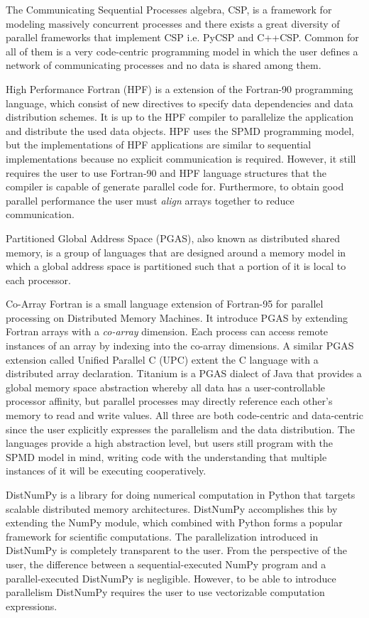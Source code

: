 \documentclass{acm_proc_article-sp}
\begin{document}
The Communicating Sequential Processes algebra, CSP\cite{CSPHoare78}, is a framework for modeling massively concurrent processes and there exists a great diversity of parallel frameworks that implement CSP i.e. PyCSP\cite{PyCSP07} and C++CSP\cite{CSP_Brown03}. Common for all of them is a very code-centric programming model in which the user defines a network of communicating processes and no data is shared among them.

High Performance Fortran (HPF) \cite{Loveman93} is a extension of the Fortran-90 programming language, which consist of new directives to specify data dependencies and data distribution schemes. It is up to the HPF compiler to parallelize the application and distribute the used data objects. HPF uses the SPMD programming model, but the implementations of HPF applications are similar to sequential implementations because no explicit communication is required. However, it still requires the user to use Fortran-90 and HPF language structures that the compiler is capable of generate parallel code for. Furthermore, to obtain good parallel performance the user must \emph{align} arrays together to reduce communication.

Partitioned Global Address Space (PGAS), also known as distributed shared memory, is a group of languages that are designed around a memory model in which a global address space is partitioned such that a portion of it is local to each processor.

Co-Array Fortran\cite{Co-arrayFortran98} is a small language extension of Fortran-95 for parallel processing on Distributed Memory Machines. It introduce PGAS by extending Fortran arrays with a \emph{co-array} dimension. Each process can access remote instances of an array by indexing into the co-array dimensions. A similar PGAS extension called Unified Parallel C (UPC)\cite{Carlson99_UPC} extent the C language with a distributed array declaration. Titanium\cite{Yelick1998_Titanium} is a PGAS dialect of Java that provides a global memory space abstraction whereby all data has a user-controllable processor affinity, but parallel processes may directly reference each other's memory to read and write values. All three are both code-centric and data-centric since the user explicitly expresses the parallelism and the data distribution. The languages provide a high abstraction level, but users still program with the SPMD model in mind, writing code with the understanding that multiple instances of it will be executing cooperatively.

DistNumPy\cite{kristensen10_dnumpy} is a library for doing numerical computation in Python that targets scalable distributed memory architectures. DistNumPy accomplishes this by extending the NumPy module\cite{numpy}, which combined with Python forms a popular framework for scientific computations. The parallelization introduced in DistNumPy is completely transparent to the user. From the perspective of the user, the difference between a sequential-executed NumPy program and a parallel-executed DistNumPy is negligible. However, to be able to introduce parallelism DistNumPy requires the user to use vectorizable computation expressions. 
\end{document}
